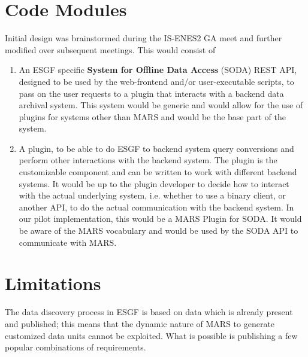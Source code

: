 \documentclass[oneside,12pt]{memoir}
\def\phname{SODA API{ }}
\begin{document}
\section{Code Modules}
Initial design was brainstormed during the IS-ENES2 GA meet and further modified over subsequent meetings. This would consist of
\begin{enumerate}
\item An ESGF specific \textbf{System for Offline Data Access} (SODA) REST API, designed to be used by the web-frontend and/or user-executable scripts, to pass on the user requests to a plugin that interacts with a backend data archival system. This system would be generic and would allow for the use of plugins for systems other than MARS and would be the base part of the system.
\item A plugin, to be able to do ESGF to backend system  query conversions and perform other interactions with the backend system. The plugin is the customizable component and can be written to work with different backend systems. It would be up to the plugin developer to decide how to interact with the actual underlying system, i.e. whether to use a binary client, or another API, to do the actual communication with the backend system. 
In our pilot implementation, this would be a MARS Plugin for SODA. It would be aware of the MARS vocabulary and would be used by the \phname to communicate with MARS.
\end{enumerate}
\section{Limitations}
The data discovery process in ESGF is based on data which is already present and published; this means that the dynamic nature of MARS to generate customized data units cannot be exploited. What is possible is publishing a few popular combinations of requirements.
\end{document}
